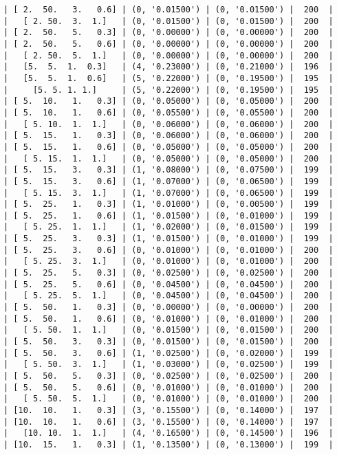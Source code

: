 \documentclass{article}
\begin{document}
\begin{verbatim}
| [ 2.  50.   3.   0.6] | (0, '0.01500') | (0, '0.01500') |  200  |
|   [ 2. 50.  3.  1.]   | (0, '0.01500') | (0, '0.01500') |  200  |
| [ 2.  50.   5.   0.3] | (0, '0.00000') | (0, '0.00000') |  200  |
| [ 2.  50.   5.   0.6] | (0, '0.00000') | (0, '0.00000') |  200  |
|   [ 2. 50.  5.  1.]   | (0, '0.00000') | (0, '0.00000') |  200  |
|   [5.  5.  1.  0.3]   | (4, '0.23000') | (0, '0.21000') |  196  |
|   [5.  5.  1.  0.6]   | (5, '0.22000') | (0, '0.19500') |  195  |
|     [5. 5. 1. 1.]     | (5, '0.22000') | (0, '0.19500') |  195  |
| [ 5.  10.   1.   0.3] | (0, '0.05000') | (0, '0.05000') |  200  |
| [ 5.  10.   1.   0.6] | (0, '0.05500') | (0, '0.05500') |  200  |
|   [ 5. 10.  1.  1.]   | (0, '0.06000') | (0, '0.06000') |  200  |
| [ 5.  15.   1.   0.3] | (0, '0.06000') | (0, '0.06000') |  200  |
| [ 5.  15.   1.   0.6] | (0, '0.05000') | (0, '0.05000') |  200  |
|   [ 5. 15.  1.  1.]   | (0, '0.05000') | (0, '0.05000') |  200  |
| [ 5.  15.   3.   0.3] | (1, '0.08000') | (0, '0.07500') |  199  |
| [ 5.  15.   3.   0.6] | (1, '0.07000') | (0, '0.06500') |  199  |
|   [ 5. 15.  3.  1.]   | (1, '0.07000') | (0, '0.06500') |  199  |
| [ 5.  25.   1.   0.3] | (1, '0.01000') | (0, '0.00500') |  199  |
| [ 5.  25.   1.   0.6] | (1, '0.01500') | (0, '0.01000') |  199  |
|   [ 5. 25.  1.  1.]   | (1, '0.02000') | (0, '0.01500') |  199  |
| [ 5.  25.   3.   0.3] | (1, '0.01500') | (0, '0.01000') |  199  |
| [ 5.  25.   3.   0.6] | (0, '0.01000') | (0, '0.01000') |  200  |
|   [ 5. 25.  3.  1.]   | (0, '0.01000') | (0, '0.01000') |  200  |
| [ 5.  25.   5.   0.3] | (0, '0.02500') | (0, '0.02500') |  200  |
| [ 5.  25.   5.   0.6] | (0, '0.04500') | (0, '0.04500') |  200  |
|   [ 5. 25.  5.  1.]   | (0, '0.04500') | (0, '0.04500') |  200  |
| [ 5.  50.   1.   0.3] | (0, '0.00000') | (0, '0.00000') |  200  |
| [ 5.  50.   1.   0.6] | (0, '0.01000') | (0, '0.01000') |  200  |
|   [ 5. 50.  1.  1.]   | (0, '0.01500') | (0, '0.01500') |  200  |
| [ 5.  50.   3.   0.3] | (0, '0.01500') | (0, '0.01500') |  200  |
| [ 5.  50.   3.   0.6] | (1, '0.02500') | (0, '0.02000') |  199  |
|   [ 5. 50.  3.  1.]   | (1, '0.03000') | (0, '0.02500') |  199  |
| [ 5.  50.   5.   0.3] | (0, '0.02500') | (0, '0.02500') |  200  |
| [ 5.  50.   5.   0.6] | (0, '0.01000') | (0, '0.01000') |  200  |
|   [ 5. 50.  5.  1.]   | (0, '0.01000') | (0, '0.01000') |  200  |
| [10.  10.   1.   0.3] | (3, '0.15500') | (0, '0.14000') |  197  |
| [10.  10.   1.   0.6] | (3, '0.15500') | (0, '0.14000') |  197  |
|   [10. 10.  1.  1.]   | (4, '0.16500') | (0, '0.14500') |  196  |
| [10.  15.   1.   0.3] | (1, '0.13500') | (0, '0.13000') |  199  |

\end{verbatim}
\end{document}

